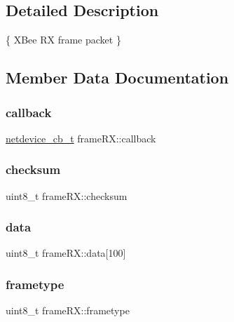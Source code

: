 \subsection{Detailed Description}
\{ X\+Bee RX frame packet \} 

\subsection{Member Data Documentation}
\mbox{\label{structframe_r_x_aa796fd31dd4da27a9a07e3d7cdd1239f}} 
\subsubsection{\texorpdfstring{callback}{callback}}
{\footnotesize\ttfamily \hyperlink{networkdevice_8h_a277c582bc58d68b7ff8ac21b18eac041}{netdevice\+\_\+cb\+\_\+t} frame\+R\+X\+::callback}

\mbox{\label{structframe_r_x_a2ef590f48976b2550c7e12f2accf1e2f}} 
\subsubsection{\texorpdfstring{checksum}{checksum}}
{\footnotesize\ttfamily uint8\+\_\+t frame\+R\+X\+::checksum}

\mbox{\label{structframe_r_x_afdb061e4b3b406bf4890e95de2fbf474}} 
\subsubsection{\texorpdfstring{data}{data}}
{\footnotesize\ttfamily uint8\+\_\+t frame\+R\+X\+::data\mbox{[}100\mbox{]}}

\mbox{\label{structframe_r_x_a4684f3a419d7c6eaf5bded40cec73cdf}} 
\subsubsection{\texorpdfstring{frametype}{frametype}}
{\footnotesize\ttfamily uint8\+\_\+t frame\+R\+X\+::frametype}

